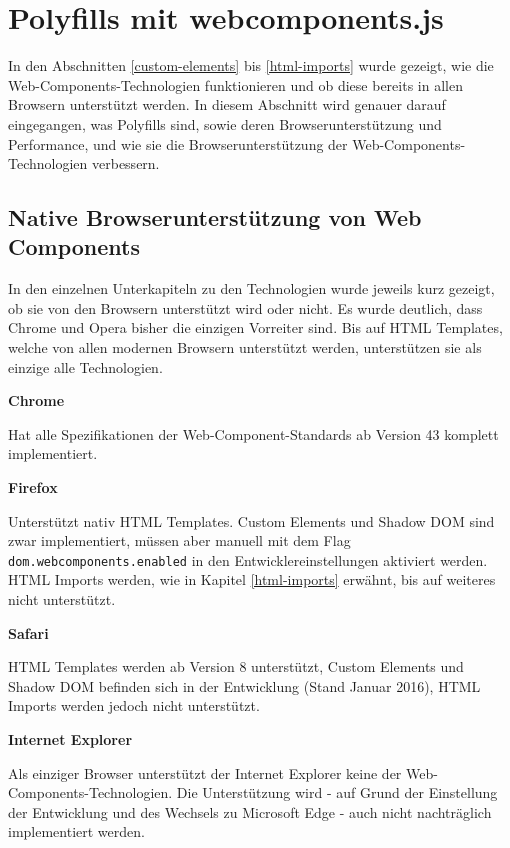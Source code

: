\section{Polyfills mit webcomponents.js}\label{polyfills-mit-webcomponents.js}

In den Abschnitten \ref{custom-elements} bis \ref{html-imports} wurde gezeigt, wie die Web-Components-Technologien funktionieren und ob diese bereits in allen Browsern unterstützt werden. In diesem Abschnitt wird genauer darauf eingegangen, was Polyfills sind, sowie deren Browserunterstützung und Performance, und wie sie die Browserunterstützung der Web-Components-Technologien verbessern.


\subsection{Native Browserunterstützung von Web Components}\label{native-browserunterstuxfctzung-von-web-components}

In den einzelnen Unterkapiteln zu den Technologien wurde jeweils kurz gezeigt, ob sie von den Browsern unterstützt wird oder nicht. Es wurde deutlich, dass Chrome und Opera bisher die einzigen Vorreiter sind. Bis auf \ac{HTML} Templates, welche von allen modernen Browsern unterstützt werden, unterstützen sie als einzige alle Technologien. \cite{citeulike:13914379}

\textbf{Chrome}

Hat alle Spezifikationen der Web-Component-Standards ab Version 43 komplett implementiert.

\textbf{Firefox}

Unterstützt nativ \ac{HTML} Templates. Custom Elements und Shadow \ac{DOM} sind zwar implementiert, müssen aber manuell mit dem Flag \texttt{dom.webcomponents.enabled} in den Entwicklereinstellungen aktiviert werden. \ac{HTML} Imports werden, wie in Kapitel \ref{html-imports} erwähnt, bis auf weiteres nicht unterstützt.

\textbf{Safari}

\ac{HTML} Templates werden ab Version 8 unterstützt, Custom Elements und Shadow \ac{DOM} befinden sich in der Entwicklung (Stand Januar 2016), \ac{HTML} Imports werden jedoch nicht unterstützt.

\textbf{Internet Explorer}

Als einziger Browser unterstützt der Internet Explorer keine der Web-Components-Technologien. Die Unterstützung wird - auf Grund der Einstellung der Entwicklung und des Wechsels zu Microsoft Edge - auch nicht nachträglich implementiert werden.

